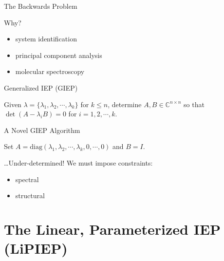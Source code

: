 \documentclass[handout]{beamer}
\begin{document}
\begin{frame}{The Backwards Problem}

  Why?~\cite{chuInverseEigenvalueProblems2005} \pause

  \begin{itemize}
    \item system identification~\cite{coxOneCanHearSR2012} \pause
    \item principal component analysis~\cite{tenbergeRetrievingCorrelationMatrixP1999} \pause
    \item molecular spectroscopy~\cite{tomanMultiplicitySolutionsInverseJoMS1966} \pause
  \end{itemize}

  \begin{titled-frame}{Generalized IEP (GIEP)}

    Given $\lambda = \{ \lambda_1, \lambda_2, \cdots, \lambda_k \}$ for $k \leq n$, determine $A, B \in \mathbb{C}^{n \times n}$ so that $\det{(A - \lambda_i B)} = 0$ for $i = 1, 2, \cdots, k$.

  \end{titled-frame} \pause

  \begin{titled-frame}{A Novel GIEP Algorithm}

    Set $A = \text{diag}(\lambda_1, \lambda_2, \cdots, \lambda_k, 0, \cdots, 0)$ and $B = I$.

  \end{titled-frame} \pause

  \ldots Under-determined! We must impose constraints: \pause

  \begin{itemize}[<+->]
    \item spectral
    \item structural
  \end{itemize}

\end{frame}

\section{The Linear, Parameterized IEP (LiPIEP)}
\end{document}
